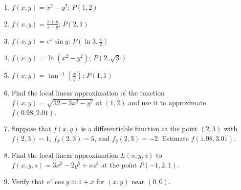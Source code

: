 \documentclass[12pt]{article}
\begin{document}
\begin{enumerate}

\item $f(x,y)=x^2-y^2$; $P(1,2)$


\item $f(x,y)=\frac{x+y}{x-y}$; $P(2,1)$


\item $f(x,y)=e^x\sin{y}$; $P\left(\ln3,\frac{\pi}{2}\right)$


\item $f(x,y)=\ln{(x^2-y^2)}$; $P\left(2,\sqrt{3}\right)$


\item $f(x,y)=\tan^{-1}\left(\frac{x}{y}\right)$; $P(1,1)$


\item Find the local linear approximation of the function $f(x,y)=\sqrt{32-3x^2-y^2}$ at $(1,2)$ and use it to approximate $f(0.98,2.01)$. 


\item Suppose that $f(x,y)$ is a differentiable function at the point $(2,3)$ with $f(2,3)=1$, $f_x(2,3)=5$, and $f_y(2,3)=-2$.  Estimate $f(1.98,3.01)$.


\item Find the local linear approximation $L(x,y,z)$ to $f(x,y,z)=3x^2-2y^2+xz^3$ at the point $P(-1,2,1)$.


\item Verify that $e^x\cos{y} \approx 1+x$ for $(x,y)$ near $(0,0)$.


\end{enumerate}
\end{document}
